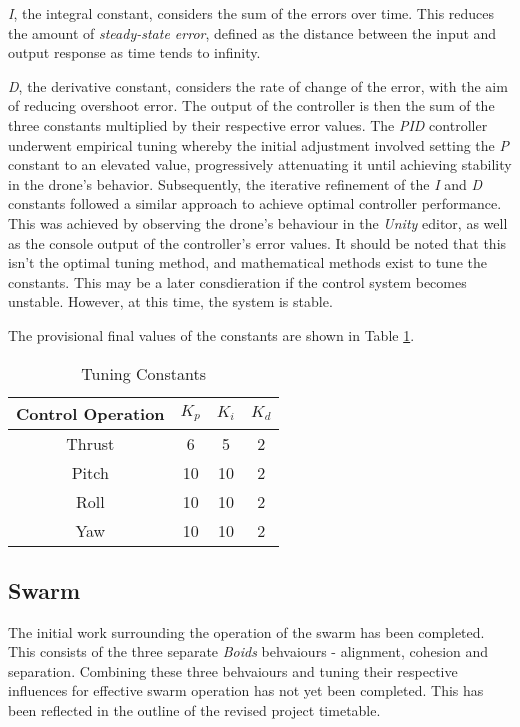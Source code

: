 \documentclass{article}
\begin{document}
\emph{I}, the integral constant, considers the sum of the errors over time. This reduces the amount of \emph{steady-state error}, defined as the distance between the input and output response as time tends to infinity.

\emph{D}, the derivative constant, considers the rate of change of the error, with the aim of reducing overshoot error. The output of the controller is then the sum of the three constants multiplied by their respective error values. The \emph{PID} controller underwent empirical tuning whereby the initial adjustment involved setting the \emph{P} constant to an elevated value, progressively attenuating it until achieving stability in the drone's behavior. Subsequently, the iterative refinement of the \emph{I} and \emph{D} constants followed a similar approach to achieve optimal controller performance. This was achieved by observing the drone's behaviour in the \emph{Unity} editor, as well as the console output of the controller's error values. It should be noted that this isn't the optimal tuning method, and mathematical methods exist to tune the constants\cite[p.67]{evans}. This may be a later consdieration if the control system becomes unstable. However, at this time, the system is stable.

The provisional final values of the constants are shown in Table \ref{tab:pid-constants}.

\begin{table}[H]
    \centering
    \begin{tabular}{| c | c | c | c |} 
    \hline
    Control Operation & $K_p$ & $K_i$ & $K_d$ \\ 
    \hline
    Thrust & 6 & 5 & 2 \\
    \hline
    Pitch & 10 & 10 & 2 \\
    \hline
    Roll & 10 & 10 & 2 \\
    \hline
    Yaw & 10 & 10 & 2 \\
    \hline
    \end{tabular}
    \caption{Tuning Constants}
    \label{tab:pid-constants}
\end{table}


\subsection{Swarm}

The initial work surrounding the operation of the swarm has been completed. This consists of the three separate \emph{Boids} behvaiours - alignment, cohesion and separation\cite{Reynolds}. Combining these three behvaiours and tuning their respective influences for effective swarm operation has not yet been completed. This has been reflected in the outline of the revised project timetable.
\end{document}
